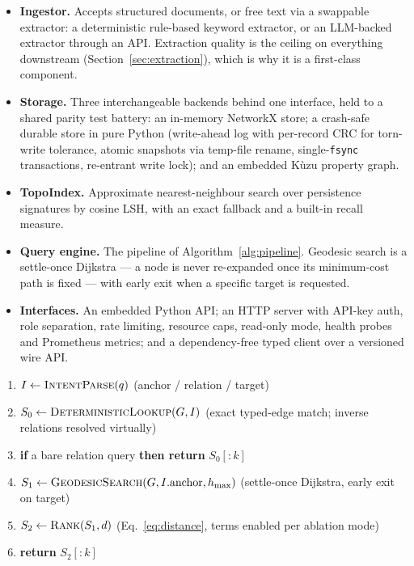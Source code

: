 \documentclass[11pt]{article}
\theoremstyle{definition}
\begin{document}
\begin{itemize}
  \item \textbf{Ingestor.} Accepts structured documents, or free text via a swappable
  extractor: a deterministic rule-based keyword extractor, or an LLM-backed extractor
  through an API. Extraction quality is the ceiling on everything downstream
  (Section~\ref{sec:extraction}), which is why it is a first-class component.

  \item \textbf{Storage.} Three interchangeable backends behind one interface, held to a
  shared parity test battery: an in-memory NetworkX store; a crash-safe durable store in
  pure Python (write-ahead log with per-record CRC for torn-write tolerance, atomic
  snapshots via temp-file rename, single-\texttt{fsync} transactions, re-entrant write
  lock); and an embedded Kùzu property graph.

  \item \textbf{TopoIndex.} Approximate nearest-neighbour search over persistence
  signatures by cosine LSH, with an exact fallback and a built-in recall measure.

  \item \textbf{Query engine.} The pipeline of Algorithm~\ref{alg:pipeline}. Geodesic
  search is a settle-once Dijkstra --- a node is never re-expanded once its minimum-cost
  path is fixed --- with early exit when a specific target is requested.

  \item \textbf{Interfaces.} An embedded Python API; an HTTP server with API-key auth,
  role separation, rate limiting, resource caps, read-only mode, health probes and
  Prometheus metrics; and a dependency-free typed client over a versioned wire API.
\end{itemize}

\begin{algorithm}
\caption{NoVectDB retrieval pipeline}
\label{alg:pipeline}
\begin{enumerate}
  \item $I \leftarrow \textsc{IntentParse}(q)$ \hfill (anchor / relation / target)
  \item $S_0 \leftarrow \textsc{DeterministicLookup}(G, I)$ \hfill (exact typed-edge
  match; inverse relations resolved virtually)
  \item \textbf{if} a bare relation query \textbf{then return} $S_0[{:}k]$
  \item $S_1 \leftarrow \textsc{GeodesicSearch}(G, I.\mathrm{anchor}, h_{\max})$
  \hfill (settle-once Dijkstra, early exit on target)
  \item $S_2 \leftarrow \textsc{Rank}(S_1, d)$ \hfill (Eq.~\eqref{eq:distance}, terms
  enabled per ablation mode)
  \item \textbf{return} $S_2[{:}k]$
\end{enumerate}
\end{algorithm}
\end{document}
